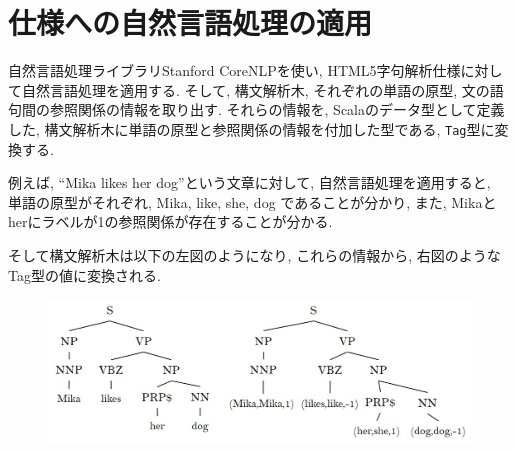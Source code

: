 \documentclass[10pt,twocolumn,uplatex,a4j]{jsreport}
\begin{document}




\section{仕様への自然言語処理の適用}
自然言語処理ライブラリStanford CoreNLPを使い, HTML5字句解析仕様に対して自然言語処理を適用する. 
そして, 構文解析木, それぞれの単語の原型, 文の語句間の参照関係の情報を取り出す. 
それらの情報を, Scalaのデータ型として定義した, 
構文解析木に単語の原型と参照関係の情報を付加した型である, \texttt{Tag}型に変換する. 

例えば, ``Mika likes her dog''という文章に対して, 
自然言語処理を適用すると, \\
単語の原型がそれぞれ, 
Mika,  like,   she,   dog 
であることが分かり, 
また, Mikaとherにラベルが1の参照関係が存在することが分かる. 

そして構文解析木は以下の左図のようになり, 
これらの情報から, 右図のようなTag型の値に変換される. 
\begin{figure}[H]
    \centering
    \includegraphics[keepaspectratio, scale=0.46]
         {tree.jpg}
\end{figure}
\end{document}
